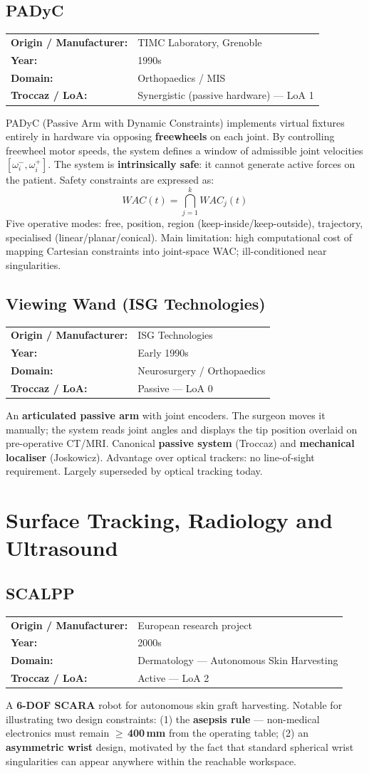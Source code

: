 \documentclass[11pt,a4paper,twoside]{report}
\makeatletter
\newcommand{\robotmeta}[4]{%
  \noindent\begin{tabular}{@{}ll@{}}
    \textbf{Origin / Manufacturer:} & #1 \\
    \textbf{Year:}                  & #2 \\
    \textbf{Domain:}                & #3 \\
    \textbf{Troccaz / LoA:}         & #4 \\
  \end{tabular}\par\smallskip\noindent}
\makeatother
\begin{document}
\section{PADyC}
\robotmeta{TIMC Laboratory, Grenoble}{1990s}{Orthopaedics / MIS}{Synergistic (passive hardware) — LoA 1}
PADyC (Passive Arm with Dynamic Constraints) implements virtual fixtures entirely in hardware via opposing \textbf{freewheels} on each joint. By controlling freewheel motor speeds, the system defines a window of admissible joint velocities $[\omega_i^-, \omega_i^+]$. The system is \textbf{intrinsically safe}: it cannot generate active forces on the patient. Safety constraints are expressed as:
\[ WAC(t) = \bigcap_{j=1}^{k} WAC_j(t) \]
Five operative modes: free, position, region (keep-inside/keep-outside), trajectory, specialised (linear/planar/conical). Main limitation: high computational cost of mapping Cartesian constraints into joint-space WAC; ill-conditioned near singularities.

\section{Viewing Wand (ISG Technologies)}
\robotmeta{ISG Technologies}{Early 1990s}{Neurosurgery / Orthopaedics}{Passive — LoA 0}
An \textbf{articulated passive arm} with joint encoders. The surgeon moves it manually; the system reads joint angles and displays the tip position overlaid on pre-operative CT/MRI. Canonical \textbf{passive system} (Troccaz) and \textbf{mechanical localiser} (Joskowicz). Advantage over optical trackers: no line-of-sight requirement. Largely superseded by optical tracking today.

\chapter{Surface Tracking, Radiology and Ultrasound}

\section{SCALPP}
\robotmeta{European research project}{2000s}{Dermatology — Autonomous Skin Harvesting}{Active — LoA 2}
A \textbf{6-DOF SCARA} robot for autonomous skin graft harvesting. Notable for illustrating two design constraints: (1) the \textbf{asepsis rule} — non-medical electronics must remain $\geq$\,\textbf{400\,mm} from the operating table; (2) an \textbf{asymmetric wrist} design, motivated by the fact that standard spherical wrist singularities can appear anywhere within the reachable workspace.
\end{document}
